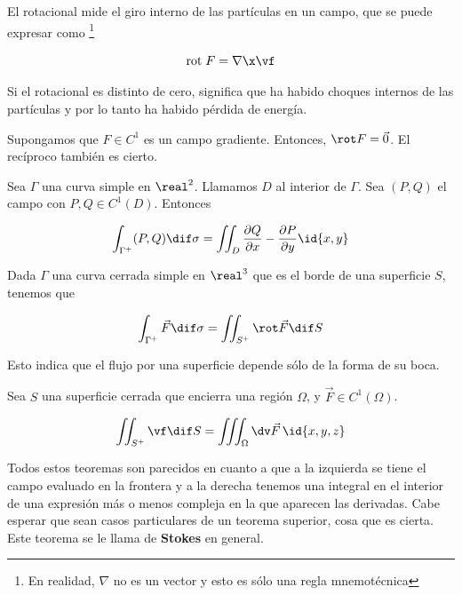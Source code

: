 \begin{defn}[Rotacional]
El rotacional mide el giro interno de las partículas en un campo, que se puede expresar como \footnote{En realidad, $\nabla$ no es un vector y esto es sólo una regla mnemotécnica}

\[ \textrm{rot}\;F = \nabla \x \vf \]

Si el rotacional es distinto de cero, significa que ha habido choques internos de las partículas y por lo tanto ha habido pérdida de energía.
\end{defn}

\begin{theorem}
Supongamos que $F\in C^1$ es un campo gradiente. Entonces, $\rot F = \vec{0}$. El recíproco también es cierto.
\end{theorem}


\begin{theorem}
Sea $\Gamma$ una curva simple en $\real^2$. Llamamos $D$ al interior de $\Gamma$. Sea $(P,Q)$ el campo con $P,Q\in C^1(D)$. Entonces

\[ \int_{\Gamma^+} (P,Q)\dif \sigma = \iint_D \frac{\partial Q}{\partial x}-\frac{\partial P}{\partial y}\id{x,y} \]
\end{theorem}

\begin{theorem}
Dada $\Gamma$ una curva cerrada simple en $\real^3$ que es el borde de una superficie $S$, tenemos que

\[ \int_{\Gamma^+}\vec{F}\dif \sigma =\iint_{S^+}\rot \vec{F}\dif S \]

Esto indica que el flujo por una superficie depende sólo de la forma de su boca.
\end{theorem}

\begin{theorem}
Sea $S$ una superficie cerrada que encierra una región $\Omega$, y $\vec{F}\in C^1(\Omega)$.

\[ \iint_{S^+} \vf \dif S = \iiint_\Omega \dv \vec{F}\, \id{x,y,z} \]
\end{theorem}


Todos estos teoremas son parecidos en cuanto a que a la izquierda se tiene el campo evaluado en la frontera y a la derecha tenemos una integral en el interior de una expresión más o menos compleja en la que aparecen las derivadas. Cabe esperar que sean casos particulares de un teorema superior, cosa que es cierta. Este teorema se le llama de \textbf{Stokes} en general.

